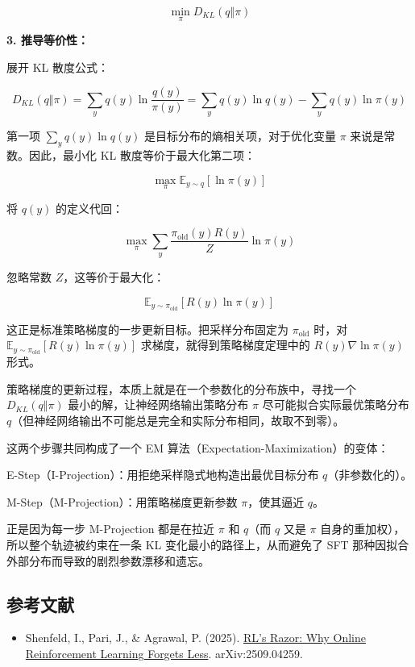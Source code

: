 \[
\min_\pi D_{KL}(q\Vert \pi)
\]

\textbf{3. 推导等价性：}

展开 KL 散度公式：

\[
D_{KL}(q\Vert \pi)
= \sum_y q(y)\ln\frac{q(y)}{\pi(y)}
= \sum_y q(y)\ln q(y)-\sum_y q(y)\ln\pi(y)
\]

第一项 \(\sum_y q(y)\ln q(y)\) 是目标分布的熵相关项，对于优化变量 \(\pi\) 来说是常数。因此，最小化 KL 散度等价于最大化第二项：

\[
\max_\pi \mathbb{E}_{y\sim q}[\ln \pi(y)]
\]

将 \(q(y)\) 的定义代回：

\[
\max_\pi \sum_y \frac{\pi_{\mathrm{old}}(y)R(y)}{Z}\ln\pi(y)
\]

忽略常数 \(Z\)，这等价于最大化：

\[
\mathbb{E}_{y\sim \pi_{\mathrm{old}}}[R(y)\ln\pi(y)]
\]

这正是标准策略梯度的一步更新目标。把采样分布固定为 \(\pi_{\mathrm{old}}\) 时，对 \(\mathbb{E}_{y\sim\pi_{\mathrm{old}}}[R(y)\ln\pi(y)]\) 求梯度，就得到策略梯度定理中的 \(R(y)\nabla\ln\pi(y)\) 形式。

策略梯度的更新过程，本质上就是在一个参数化的分布族中，寻找一个 \(D_{KL}(q\Vert \pi)\) 最小的解，让神经网络输出策略分布 \(\pi\) 尽可能拟合实际最优策略分布 \(q\)（但神经网络输出不可能总是完全和实际分布相同，故取不到零）。

这两个步骤共同构成了一个 EM 算法（Expectation-Maximization）的变体：

E-Step（I-Projection）：用拒绝采样隐式地构造出最优目标分布 \(q\)（非参数化的）。

M-Step（M-Projection）：用策略梯度更新参数 \(\pi\)，使其逼近 \(q\)。

正是因为每一步 M-Projection 都是在拉近 \(\pi\) 和 \(q\)（而 \(q\) 又是 \(\pi\) 自身的重加权），所以整个轨迹被约束在一条 KL 变化最小的路径上，从而避免了 SFT 那种因拟合外部分布而导致的剧烈参数漂移和遗忘。

\hypertarget{ux53c2ux8003ux6587ux732e-85}{%
\subsection{参考文献}\label{ux53c2ux8003ux6587ux732e-85}}

\begin{itemize}
\tightlist
\item
  Shenfeld, I., Pari, J., \& Agrawal, P. (2025). \href{https://arxiv.org/abs/2509.04259}{RL's Razor: Why Online Reinforcement Learning Forgets Less}. arXiv:2509.04259.
\end{itemize}

\clearpage
